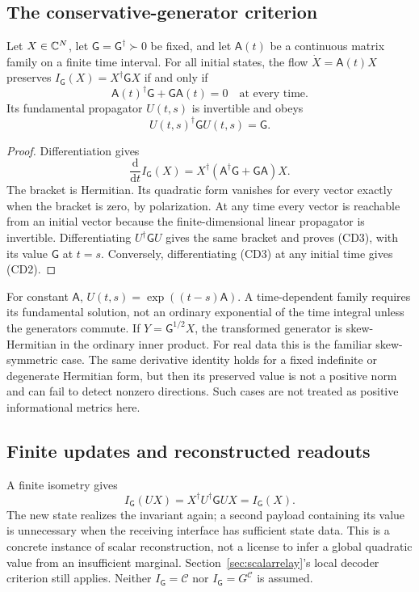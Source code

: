 \subsection{The conservative-generator criterion}
\begin{proposition}\label{prop:skewcriterion}
Let $X\in\mathbb C^N$, let $\mathsf G=\mathsf G^\dagger\succ0$ be fixed, and let $\mathsf A(t)$ be a continuous matrix family on a finite time interval. For all initial states, the flow $\dot X=\mathsf A(t)X$ preserves $I_{\mathsf G}(X)=X^\dagger\mathsf G X$ if and only if
\begin{equation}
\mathsf A(t)^\dagger\mathsf G+\mathsf G\mathsf A(t)=0
\quad\text{at every time.}
\tag{CD2}\label{eq:skewcriterion}
\end{equation}
Its fundamental propagator $U(t,s)$ is invertible and obeys
\begin{equation}
U(t,s)^\dagger\mathsf G U(t,s)=\mathsf G.
\tag{CD3}\label{eq:finiteisometry}
\end{equation}
\end{proposition}
\begin{proof}
Differentiation gives
\[
\frac{\mathrm d}{\mathrm dt}I_{\mathsf G}(X)
=X^\dagger(\mathsf A^\dagger\mathsf G+\mathsf G\mathsf A)X.
\]
The bracket is Hermitian. Its quadratic form vanishes for every vector exactly when the bracket is zero, by polarization. At any time every vector is reachable from an initial vector because the finite-dimensional linear propagator is invertible. Differentiating $U^\dagger\mathsf G U$ gives the same bracket and proves (CD3), with its value $\mathsf G$ at $t=s$. Conversely, differentiating (CD3) at any initial time gives (CD2).
\end{proof}
For constant $\mathsf A$, $U(t,s)=\exp((t-s)\mathsf A)$. A time-dependent family requires its fundamental solution, not an ordinary exponential of the time integral unless the generators commute. If $Y=\mathsf G^{1/2}X$, the transformed generator is skew-Hermitian in the ordinary inner product. For real data this is the familiar skew-symmetric case. The same derivative identity holds for a fixed indefinite or degenerate Hermitian form, but then its preserved value is not a positive norm and can fail to detect nonzero directions. Such cases are not treated as positive informational metrics here.

\subsection{Finite updates and reconstructed readouts}
A finite isometry gives
\[
I_{\mathsf G}(UX)=X^\dagger U^\dagger\mathsf G UX=I_{\mathsf G}(X).
\]
The new state realizes the invariant again; a second payload containing its value is unnecessary when the receiving interface has sufficient state data. This is a concrete instance of scalar reconstruction, not a license to infer a global quadratic value from an insufficient marginal. Section~\ref{sec:scalarrelay}'s local decoder criterion still applies. Neither $I_{\mathsf G}=\mathcal C$ nor $I_{\mathsf G}=G^{\mathcal C}$ is assumed.


